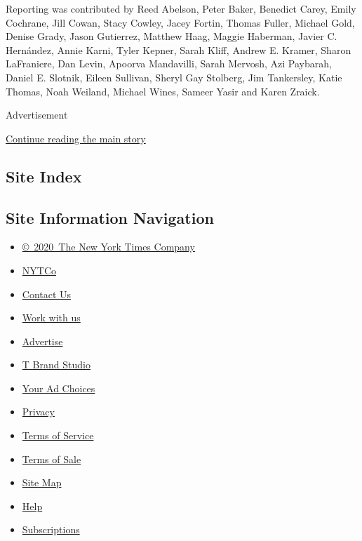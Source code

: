 Reporting was contributed by Reed Abelson, Peter Baker, Benedict Carey,
Emily Cochrane, Jill Cowan, Stacy Cowley, Jacey Fortin, Thomas Fuller,
Michael Gold, Denise Grady, Jason Gutierrez, Matthew Haag, Maggie
Haberman, Javier C. Hernández, Annie Karni, Tyler Kepner, Sarah Kliff,
Andrew E. Kramer, Sharon LaFraniere, Dan Levin, Apoorva Mandavilli,
Sarah Mervosh, Azi Paybarah, Daniel E. Slotnik, Eileen Sullivan, Sheryl
Gay Stolberg, Jim Tankersley, Katie Thomas, Noah Weiland, Michael Wines,
Sameer Yasir and Karen Zraick.

Advertisement

\protect\hyperlink{after-bottom}{Continue reading the main story}

\hypertarget{site-index}{%
\subsection{Site Index}\label{site-index}}

\hypertarget{site-information-navigation}{%
\subsection{Site Information
Navigation}\label{site-information-navigation}}

\begin{itemize}
\tightlist
\item
  \href{https://help.nytimes.com/hc/en-us/articles/115014792127-Copyright-notice}{©~2020~The
  New York Times Company}
\end{itemize}

\begin{itemize}
\tightlist
\item
  \href{https://www.nytco.com/}{NYTCo}
\item
  \href{https://help.nytimes.com/hc/en-us/articles/115015385887-Contact-Us}{Contact
  Us}
\item
  \href{https://www.nytco.com/careers/}{Work with us}
\item
  \href{https://nytmediakit.com/}{Advertise}
\item
  \href{http://www.tbrandstudio.com/}{T Brand Studio}
\item
  \href{https://www.nytimes.com/privacy/cookie-policy\#how-do-i-manage-trackers}{Your
  Ad Choices}
\item
  \href{https://www.nytimes.com/privacy}{Privacy}
\item
  \href{https://help.nytimes.com/hc/en-us/articles/115014893428-Terms-of-service}{Terms
  of Service}
\item
  \href{https://help.nytimes.com/hc/en-us/articles/115014893968-Terms-of-sale}{Terms
  of Sale}
\item
  \href{https://spiderbites.nytimes.com}{Site Map}
\item
  \href{https://help.nytimes.com/hc/en-us}{Help}
\item
  \href{https://www.nytimes.com/subscription?campaignId=37WXW}{Subscriptions}
\end{itemize}
